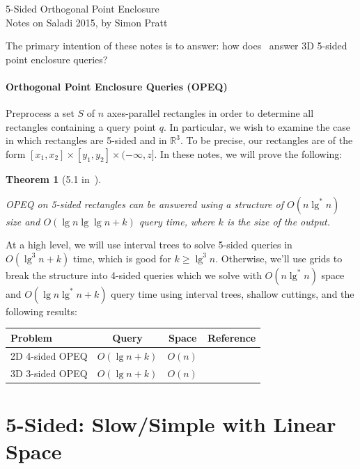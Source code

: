 \documentclass[letterpaper,12pt,twocolumn]{article}
\newcommand\lspace{\hspace{-0.5em}}
\newcommand{\BigOh}[1]{O\!\left(#1\right)}
\newcommand\IR{\mathbb{R}}
\newcommand\bounds[1]{[#1]}
\newcommand\lbounds[1]{(#1]} %
\theoremstyle{plain}
\newtheorem{theorem}{Theorem}
\begin{document}
{\noindent\Large 5-Sided Orthogonal Point Enclosure}\\
{\noindent Notes on Saladi 2015, by Simon Pratt}

The primary intention of these notes is to answer: how
does~\cite{saladi2015improved} answer 3D 5-sided point enclosure
queries?

\paragraph{Orthogonal Point Enclosure Queries (OPEQ)}
Preprocess a set $S$ of $n$ axes-parallel rectangles in order to
determine all rectangles containing a query point $q$.  In particular,
we wish to examine the case in which rectangles are 5-sided and in
$\IR^3$.  To be precise, our rectangles are of the form
$\bounds{x_1,x_2} \times \bounds{y_1, y_2} \times
\lbounds{-\infty,z}$.  In these notes, we will prove the following:

\begin{theorem}[5.1 in~\cite{saladi2015improved}]\label{thm:51}

  OPEQ on 5-sided rectangles can be answered using a structure of
  $\BigOh{n\lg^* n}$ size and $\BigOh{\lg n \lg\lg n + k}$ query time,
  where $k$ is the size of the output.

\end{theorem}

At a high level, we will use interval trees to solve 5-sided queries
in $\BigOh{\lg^3 n + k}$ time, which is good for $k \ge \lg^3 n$.
Otherwise, we'll use grids to break the structure into 4-sided queries
which we solve with $\BigOh{n\lg^* n}$ space and $\BigOh{\lg n\lg^* n
  + k}$ query time using interval trees, shallow cuttings, and the
following results:

\noindent\begin{tabular}{lccr}
    \toprule
    Problem & Query & Space & Reference \\
    \midrule
    2D 4-sided OPEQ & $\BigOh{\lg n + k}$ & $\BigOh{n}$ & \cite{chazelle1986filtering} \\ %
    3D 3-sided OPEQ & $\BigOh{\lg n + k}$ & $\BigOh{n}$ & \cite{afshani2008dominance} \\ %
    \bottomrule
\end{tabular}

\section{\lspace{} 5-Sided: Slow/Simple with Linear Space}
\label{sec:slow}
\end{document}
